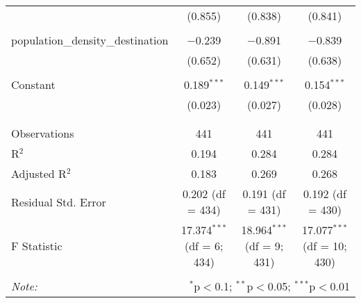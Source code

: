 \begin{table}[!htbp]
\begin{tabular}{@{\extracolsep{5pt}}lccc}
  & (0.855) & (0.838) & (0.841) \\ 
  & & & \\ 
 population\_density\_destination & $-$0.239 & $-$0.891 & $-$0.839 \\ 
  & (0.652) & (0.631) & (0.638) \\ 
  & & & \\ 
 Constant & 0.189$^{***}$ & 0.149$^{***}$ & 0.154$^{***}$ \\ 
  & (0.023) & (0.027) & (0.028) \\ 
  & & & \\ 
\hline \\[-1.8ex] 
Observations & 441 & 441 & 441 \\ 
R$^{2}$ & 0.194 & 0.284 & 0.284 \\ 
Adjusted R$^{2}$ & 0.183 & 0.269 & 0.268 \\ 
Residual Std. Error & 0.202 (df = 434) & 0.191 (df = 431) & 0.192 (df = 430) \\ 
F Statistic & 17.374$^{***}$ (df = 6; 434) & 18.964$^{***}$ (df = 9; 431) & 17.077$^{***}$ (df = 10; 430) \\ 
\hline 
\hline \\[-1.8ex] 
\textit{Note:}  & \multicolumn{3}{r}{$^{*}$p$<$0.1; $^{**}$p$<$0.05; $^{***}$p$<$0.01} \\ 
\end{tabular} 
\end{table} 
